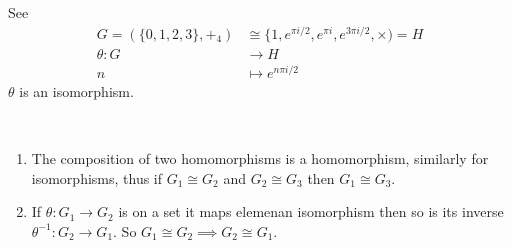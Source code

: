 See 
\begin{align*}
    G = (\{ 0, 1, 2, 3 \}, +_4) &\cong \{1, e^{\pi i/2}, e^{\pi i}, e^{3\pi i/2}, \times) = H \\
    \theta: G &\to H \\
    n &\mapsto e^{n \pi i /2}
\end{align*}
\(\theta\) is an isomorphism.

\begin{lemma}~
  \vspace*{-1.5\baselineskip}
\begin{enumerate}
\def\labelenumi{\roman{enumi}.}
  \item The composition of two homomorphisms is a homomorphism, similarly for isomorphisms, thus if \(G_1 \cong G_2\) and \(G_2 \cong G_3\) then \(G_1 \cong G_3\).
  \item
    If \(\theta : G_1 \to G_2\) is on a set it maps elemenan isomorphism then so is its inverse \(\theta^{-1} : G_2 \to G_1\).
    So \(G_1 \cong G_2 \implies G_2 \cong G_1\).
\end{enumerate}
\end{lemma}

